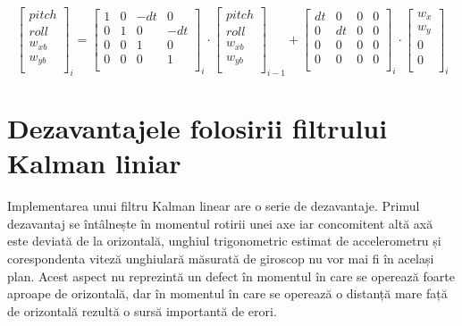 \begin{equation} 
\begin{bmatrix}
pitch\\
roll\\
w_{xb}\\
w_{yb}\\
\end{bmatrix}_i
=
\begin{bmatrix}
1 & 0 & -dt & 0 \\
0 & 1 & 0 & -dt \\
0 & 0 & 1 & 0 \\
0 & 0 & 0 & 1 \\
\end{bmatrix}_i
\cdot
\begin{bmatrix}
pitch\\
roll\\
w_{xb}\\
w_{yb}\\
\end{bmatrix}_{i-1}
+
\begin{bmatrix}
dt & 0 & 0 & 0 \\
0 & dt & 0 & 0 \\
0 & 0 & 0 & 0 \\
0 & 0 & 0 & 0 \\
\end{bmatrix}_i
\cdot
\begin{bmatrix}
w_x\\
w_y\\
0\\
0\\
\end{bmatrix}_i
\end{equation}


\section{Dezavantajele folosirii filtrului Kalman liniar}
\-\hspace{1cm}Implementarea unui filtru Kalman linear are o serie de dezavantaje. Primul dezavantaj se întâlnește în momentul rotirii unei axe iar concomitent altă axă este deviată de la orizontală, unghiul trigonometric estimat de accelerometru și corespondenta viteză unghiulară măsurată de giroscop nu vor mai fi în același plan. Acest aspect nu reprezintă un defect în momentul în care se operează foarte aproape de orizontală, dar în momentul în care se operează o distanță mare față de orizontală rezultă o sursă importantă de erori.

